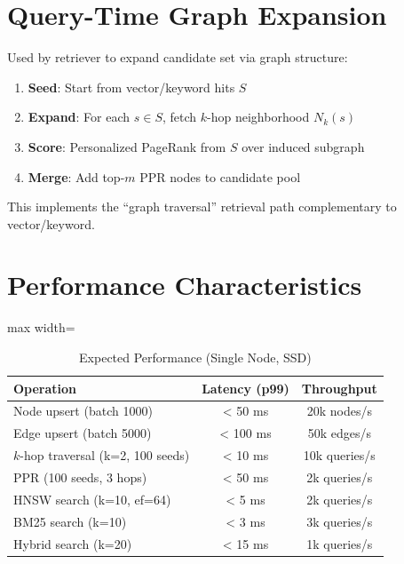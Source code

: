 \section{Query-Time Graph Expansion}
\label{sec:kg:graph-expansion}

Used by retriever to expand candidate set via graph structure:

\begin{enumerate}
  \item \textbf{Seed}: Start from vector/keyword hits $S$
  \item \textbf{Expand}: For each $s \in S$, fetch $k$-hop neighborhood $N_k(s)$
  \item \textbf{Score}: Personalized PageRank from $S$ over induced subgraph
  \item \textbf{Merge}: Add top-$m$ PPR nodes to candidate pool
\end{enumerate}

This implements the ``graph traversal'' retrieval path complementary to vector/keyword.

\section{Performance Characteristics}
\label{sec:kg:performance}

\begin{table}[htbp]
\centering
\caption{Expected Performance (Single Node, SSD)}
\label{tab:kg:perf}
\begin{adjustbox}{max width=\textwidth}
\begin{tabular}{lcc}
\toprule
\textbf{Operation} & \textbf{Latency (p99)} & \textbf{Throughput} \\
\midrule
Node upsert (batch 1000) & < 50 ms & 20k nodes/s \\
Edge upsert (batch 5000) & < 100 ms & 50k edges/s \\
$k$-hop traversal (k=2, 100 seeds) & < 10 ms & 10k queries/s \\
PPR (100 seeds, 3 hops) & < 50 ms & 2k queries/s \\
HNSW search (k=10, ef=64) & < 5 ms & 2k queries/s \\
BM25 search (k=10) & < 3 ms & 3k queries/s \\
Hybrid search (k=20) & < 15 ms & 1k queries/s \\
\bottomrule
\end{tabular}
\end{adjustbox}
\end{table}


